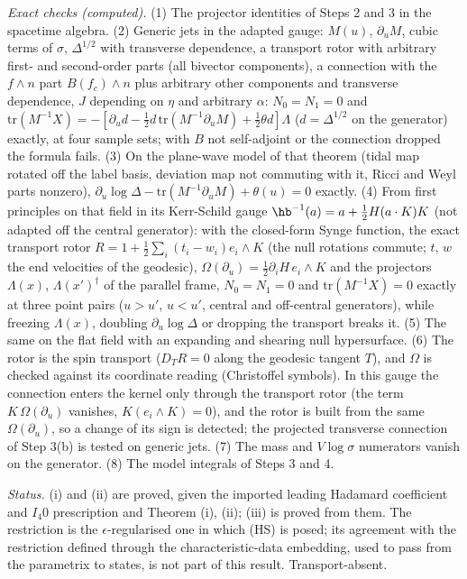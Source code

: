 \emph{Exact checks (computed).} (1) The projector identities of Steps 2 and 3 in the spacetime algebra. (2) Generic jets in the adapted gauge: $M(u)$, $\partial_{u}M$, cubic terms of $\sigma$, $\Delta^{1/2}$ with transverse dependence, a transport rotor with arbitrary first- and second-order parts (all bivector components), a connection with the $f\wedge n$ part $B(f_{c})\wedge n$ plus arbitrary other components and transverse dependence, $J$ depending on $\eta$ and arbitrary $\alpha$: $N_{0} = N_{1} = 0$ and $\mathrm{tr}(M^{-1}X) = -[\partial_{u}d - \tfrac12 d\,\mathrm{tr}(M^{-1}\partial_{u}M) + \tfrac12\theta d]\Lambda$ ($d = \Delta^{1/2}$ on the generator) exactly, at four sample sets; with $B$ not self-adjoint or the connection dropped the formula fails. (3) On the plane-wave model of that theorem (tidal map rotated off the label basis, deviation map not commuting with it, Ricci and Weyl parts nonzero), $\partial_{u}\log\Delta - \mathrm{tr}(M^{-1}\partial_{u}M) + \theta(u) = 0$ exactly. (4) From first principles on that field in its Kerr-Schild gauge $\hb^{-1}(a) = a + \tfrac12 H(a\cdot K)K$ (not adapted off the central generator): with the closed-form Synge function, the exact transport rotor $R = 1 + \tfrac12\sum_{i}(t_{i} - w_{i})e_{i}\wedge K$ (the null rotations commute; $t$, $w$ the end velocities of the geodesic), $\Omega(\partial_{u}) = \tfrac12\partial_{i}H\,e_{i}\wedge K$ and the projectors $\Lambda(x)$, $\Lambda(x')^{\dagger}$ of the parallel frame, $N_{0} = N_{1} = 0$ and $\mathrm{tr}(M^{-1}X) = 0$ exactly at three point pairs ($u > u'$, $u < u'$, central and off-central generators), while freezing $\Lambda(x)$, doubling $\partial_{u}\log\Delta$ or dropping the transport breaks it. (5) The same on the flat field with an expanding and shearing null hypersurface. (6) The rotor is the spin transport ($D_{T}R = 0$ along the geodesic tangent $T$), and $\Omega$ is checked against its coordinate reading (Christoffel symbols). In this gauge the connection enters the kernel only through the transport rotor (the term $K\,\Omega(\partial_{u})$ vanishes, $K(e_{i}\wedge K) = 0$), and the rotor is built from the same $\Omega(\partial_{u})$, so a change of its sign is detected; the projected transverse connection of Step 3(b) is tested on generic jets. (7) The mass and $V\log\sigma$ numerators vanish on the generator. (8) The model integrals of Steps 3 and 4.

\emph{Status.} (i) and (ii) are proved, given the imported leading Hadamard coefficient and $I_{4}0$ prescription and Theorem (i), (ii); (iii) is proved from them. The restriction is the $\epsilon$-regularised one in which (HS) is posed; its agreement with the restriction defined through the characteristic-data embedding, used to pass from the parametrix to states, is not part of this result. Transport-absent.
